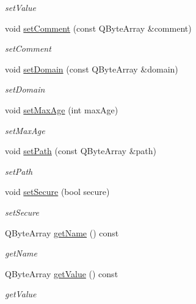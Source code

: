 \begin{DoxyCompactItemize}
\begin{DoxyCompactList}\small\item\em set\+Value \end{DoxyCompactList}\item 
void \mbox{\hyperlink{class_http_cookie_a77e86a49664f147dc359cb9ad8a9013b}{set\+Comment}} (const Q\+Byte\+Array \&comment)
\begin{DoxyCompactList}\small\item\em set\+Comment \end{DoxyCompactList}\item 
void \mbox{\hyperlink{class_http_cookie_ae4bd49d769fb962399fa1692fe30c8f1}{set\+Domain}} (const Q\+Byte\+Array \&domain)
\begin{DoxyCompactList}\small\item\em set\+Domain \end{DoxyCompactList}\item 
void \mbox{\hyperlink{class_http_cookie_a4bee3fe68608752f1bea204a3a6b5134}{set\+Max\+Age}} (int max\+Age)
\begin{DoxyCompactList}\small\item\em set\+Max\+Age \end{DoxyCompactList}\item 
void \mbox{\hyperlink{class_http_cookie_ae302154143022f4bb213afc569df8dd5}{set\+Path}} (const Q\+Byte\+Array \&path)
\begin{DoxyCompactList}\small\item\em set\+Path \end{DoxyCompactList}\item 
void \mbox{\hyperlink{class_http_cookie_ab96aa1b1dd995c05fc0e092e1fb7b1e3}{set\+Secure}} (bool secure)
\begin{DoxyCompactList}\small\item\em set\+Secure \end{DoxyCompactList}\item 
Q\+Byte\+Array \mbox{\hyperlink{class_http_cookie_abecd0373e90e3701e82bb4dc630c54a7}{get\+Name}} () const
\begin{DoxyCompactList}\small\item\em get\+Name \end{DoxyCompactList}\item 
Q\+Byte\+Array \mbox{\hyperlink{class_http_cookie_a04d3cdafe9c7e5f9068816abf33aa4a9}{get\+Value}} () const
\begin{DoxyCompactList}\small\item\em get\+Value \end{DoxyCompactList}\item 

\end{DoxyCompactItemize}
